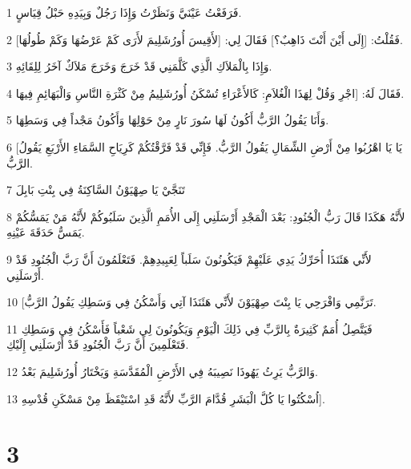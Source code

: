 \par 1 فَرَفَعْتُ عَيْنَيَّ وَنَظَرْتُ وَإِذَا رَجُلٌ وَبِيَدِهِ حَبْلُ قِيَاسٍ.
\par 2 فَقُلْتُ: [إِلَى أَيْنَ أَنْتَ ذَاهِبٌ؟] فَقَالَ لِي: [لأَقِيسَ أُورُشَلِيمَ لأَرَى كَمْ عَرْضُهَا وَكَمْ طُولُهَا].
\par 3 وَإِذَا بِالْمَلاَكِ الَّذِي كَلَّمَنِي قَدْ خَرَجَ وَخَرَجَ مَلاَكٌ آخَرُ لِلِقَائِهِ.
\par 4 فَقَالَ لَهُ: [اجْرِ وَقُلْ لِهَذَا الْغُلاَمِ: كَالأَعْرَاءِ تُسْكَنُ أُورُشَلِيمُ مِنْ كَثْرَةِ النَّاسِ وَالْبَهَائِمِ فِيهَا.
\par 5 وَأَنَا يَقُولُ الرَّبُّ أَكُونُ لَهَا سُورَ نَارٍ مِنْ حَوْلِهَا وَأَكُونُ مَجْداً فِي وَسَطِهَا.
\par 6 [يَا يَا اهْرُبُوا مِنْ أَرْضِ الشِّمَالِ يَقُولُ الرَّبُّ. فَإِنِّي قَدْ فَرَّقْتُكُمْ كَرِيَاحِ السَّمَاءِ الأَرْبَعِ يَقُولُ الرَّبُّ.
\par 7 تَنَجَّيْ يَا صِهْيَوْنُ السَّاكِنَةُ فِي بِنْتِ بَابِلَ
\par 8 لأَنَّهُ هَكَذَا قَالَ رَبُّ الْجُنُودِ: بَعْدَ الْمَجْدِ أَرْسَلَنِي إِلَى الأُمَمِ الَّذِينَ سَلَبُوكُمْ لأَنَّهُ مَنْ يَمَسُّكُمْ يَمَسُّ حَدَقَةَ عَيْنِهِ.
\par 9 لأَنِّي هَئَنَذَا أُحَرِّكُ يَدِي عَلَيْهِمْ فَيَكُونُونَ سَلَباً لِعَبِيدِهِمْ. فَتَعْلَمُونَ أَنَّ رَبَّ الْجُنُودِ قَدْ أَرْسَلَنِي.
\par 10 [تَرَنَّمِي وَافْرَحِي يَا بِنْتَ صِهْيَوْنَ لأَنِّي هَئَنَذَا آتِي وَأَسْكُنُ فِي وَسَطِكِ يَقُولُ الرَّبُّ.
\par 11 فَيَتَّصِلُ أُمَمٌ كَثِيرَةٌ بِالرَّبِّ فِي ذَلِكَ الْيَوْمِ وَيَكُونُونَ لِي شَعْباً فَأَسْكُنُ فِي وَسَطِكِ فَتَعْلَمِينَ أَنَّ رَبَّ الْجُنُودِ قَدْ أَرْسَلَنِي إِلَيْكِ.
\par 12 وَالرَّبُّ يَرِثُ يَهُوذَا نَصِيبَهُ فِي الأَرْضِ الْمُقَدَّسَةِ وَيَخْتَارُ أُورُشَلِيمَ بَعْدُ.
\par 13 اُسْكُتُوا يَا كُلَّ الْبَشَرِ قُدَّامَ الرَّبِّ لأَنَّهُ قَدِ اسْتَيْقَظَ مِنْ مَسْكَنِ قُدْسِهِ].

\chapter{3}

